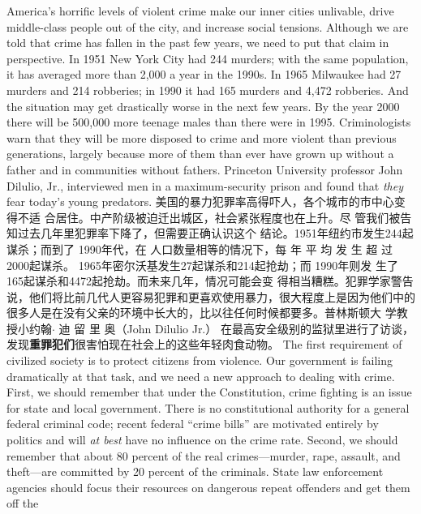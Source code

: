 \begin{paracol}{2}
America's horrific levels of violent crime make our inner cities
unlivable, drive middle-class people out of the city, and increase social tensions. Although we are told that crime has fallen in
the past few years, we need to put that claim in perspective. In
1951 New York City had 244 murders; with the same population, it has averaged more than 2,000 a year in the 1990s. In
1965 Milwaukee had 27 murders and 214 robberies; in 1990 it
had 165 murders and 4,472 robberies. And the situation may
get drastically worse in the next few years. By the year 2000
there will be 500,000 more teenage males than there were in
1995. Criminologists warn that they will be more disposed to
crime and more violent than previous generations, largely because more of them than ever have grown up without a father
and in communities without fathers. Princeton University professor John Dilulio, Jr., interviewed men in a maximum-security prison and found that \textit{they} fear today's young predators.
\switchcolumn
美国的暴力犯罪率高得吓人，各个城市的市中心变得不适
合居住。中产阶级被迫迁出城区，社会紧张程度也在上升。尽
管我们被告知过去几年里犯罪率下降了，但需要正确认识这个
结论。1951年纽约市发生244起谋杀；而到了 1990年代，在
人口数量相等的情况下，每 年 平 均 发 生 超 过 2000起谋杀。
1965年密尔沃基发生27起谋杀和214起抢劫；而 1990年则发
生了 165起谋杀和4472起抢劫。而未来几年，情况可能会变
得相当糟糕。犯罪学家警告说，他们将比前几代人更容易犯罪和更喜欢使用暴力，很大程度上是因为他们中的很多人是在没有父亲的环境中长大的，比以往任何时候都要多。普林斯顿大
学教授小约翰$\cdot$ 迪 留 里 奥（John Dilulio Jr.） 在最高安全级别的监狱里进行了访谈，发现\textbf{重罪犯们}很害怕现在社会上的这些年轻肉食动物。
\switchcolumn*
The first requirement of civilized society is to protect citizens
from violence. Our government is failing dramatically at that
task, and we need a new approach to dealing with crime. First,
we should remember that under the Constitution, crime fighting is an issue for state and local government. There is no constitutional authority for a general federal criminal code; recent
federal ``crime bills'' are motivated entirely by politics and will
\textit{at best} have no influence on the crime rate. Second, we should
remember that about 80 percent of the real crimes---murder,
rape, assault, and theft---are committed by 20 percent of the
criminals. State law enforcement agencies should focus their resources on dangerous repeat offenders and get them off the

\end{paracol}
